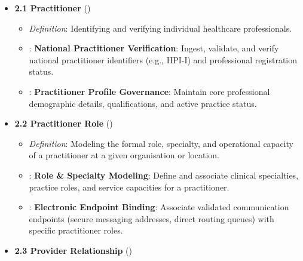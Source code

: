 \begin{itemize}

\item
\textbf{2.1 Practitioner} (\texttt{})


\begin{itemize}

\item
\emph{Definition}: Identifying and verifying individual healthcare professionals.



\item
\texttt{}: \textbf{National Practitioner Verification}: Ingest, validate, and verify national practitioner identifiers (e.g., HPI-I) and professional registration status.



\item
\texttt{}: \textbf{Practitioner Profile Governance}: Maintain core professional demographic details, qualifications, and active practice status.



\end{itemize}


\item
\textbf{2.2 Practitioner Role} (\texttt{})


\begin{itemize}

\item
\emph{Definition}: Modeling the formal role, specialty, and operational capacity of a practitioner at a given organisation or location.



\item
\texttt{}: \textbf{Role \& Specialty Modeling}: Define and associate clinical specialties, practice roles, and service capacities for a practitioner.



\item
\texttt{}: \textbf{Electronic Endpoint Binding}: Associate validated communication endpoints (secure messaging addresses, direct routing queues) with specific practitioner roles.



\end{itemize}


\item
\textbf{2.3 Provider Relationship} (\texttt{})



\end{itemize}
